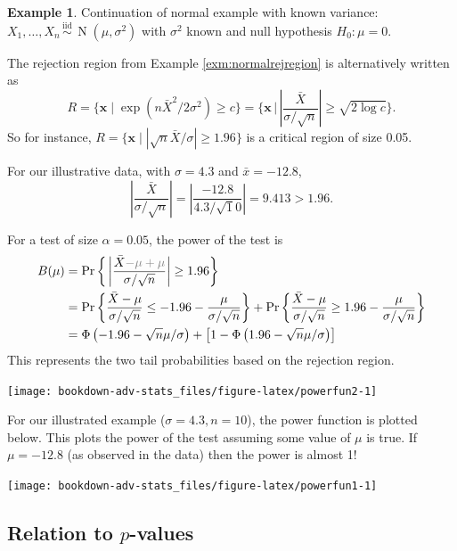 \documentclass[
]{book}
\newcommand{\bx}{{\boldsymbol x}}
\DeclareMathOperator{\N}{N}
\newcommand{\iid}{\,\overset{\text{iid}}{\sim}\,}
\theoremstyle{definition}
\theoremstyle{definition}
\newtheorem{example}{Example}[chapter]
\theoremstyle{definition}
\theoremstyle{definition}
\theoremstyle{remark}
\begin{document}
\begin{example}

Continuation of normal example with known variance: \(X_1,\dots,X_n\iid\N(\mu,\sigma^2)\) with \(\sigma^2\) known and null hypothesis \(H_0:\mu=0\).

The rejection region from Example \ref{exm:normalrejregion} is alternatively written as
\[
R 
= \{\bx \mid \exp(n\bar X^2/2\sigma^2) \geq c \} 
=  \bigg\{\bx \,\Big|\, \left| \frac{\bar X}{\sigma/\sqrt n} \right| \geq \sqrt {2\log c } \bigg\}.
\]
So for instance, \(R=\{\bx \mid |\sqrt n \bar X/\sigma| \geq 1.96 \}\) is a critical region of size 0.05.

For our illustrative data, with \(\sigma=4.3\) and \(\bar x = -12.8\),
\[
\left| \frac{\bar X}{\sigma/\sqrt n} \right|  = \left| \frac{-12.8}{4.3/\sqrt 10} \right| = 9.413 > 1.96. 
\]

For a test of size \(\alpha=0.05\), the power of the test is
\begin{align*}
B(\mu) 
&= \Pr\bigg\{\left| \frac{\bar X {\color{gray}-\mu +\mu}}{\sigma/\sqrt n} \right| \geq 1.96 \bigg\}  \\
&= 
\Pr\bigg\{\frac{\bar X -\mu}{\sigma/\sqrt n}  \leq -1.96 -\frac{\mu}{\sigma/\sqrt n} \bigg\}
+
\Pr\bigg\{\frac{\bar X -\mu}{\sigma/\sqrt n}  \geq 1.96 -\frac{\mu}{\sigma/\sqrt n} \bigg\} \\
&=\Phi\left(-1.96 -\sqrt n \mu / \sigma \right) + \left[1 - \Phi\left(1.96 -\sqrt n \mu / \sigma \right)\right]
\end{align*}
This represents the two tail probabilities based on the rejection region.

\begin{center}\texttt{[image: bookdown-adv-stats\_files/figure-latex/powerfun2-1]} \end{center}

\end{example}

For our illustrated example (\(\sigma=4.3, n=10\)), the power function is plotted below.
This plots the power of the test assuming some value of \(\mu\) is true.
If \(\mu=-12.8\) (as observed in the data) then the power is almost 1!

\begin{center}\texttt{[image: bookdown-adv-stats\_files/figure-latex/powerfun1-1]} \end{center}

\hypertarget{relation-to-p-values}{%
\subsection{\texorpdfstring{Relation to \(p\)-values}{Relation to p-values}}\label{relation-to-p-values}}
\end{document}
